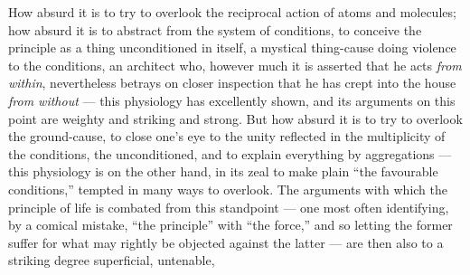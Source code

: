 \documentclass[12pt,a4paper]{book}
\begin{document}
How absurd it is to try to overlook the reciprocal action of atoms and
molecules; how absurd it is to abstract from the system of conditions, to
conceive the principle as a thing unconditioned in itself, a mystical
thing-cause doing violence to the conditions, an architect who, however much it
is asserted that he acts \emph{from within}, nevertheless betrays on closer
inspection that he has crept into the house \emph{from without} --- this
physiology has excellently shown, and its arguments on this point are weighty
and striking and strong. But how absurd it is to try to overlook the
ground-cause, to close one's eye to the unity reflected in the multiplicity of
the conditions, the unconditioned, and to explain everything by aggregations
--- this physiology is on the other hand, in its zeal to make plain ``the
favourable conditions,'' tempted in many ways to overlook. The arguments with
which the principle of life is combated from this standpoint --- one most often
identifying, by a comical mistake, ``the principle'' with ``the force,'' and so
letting the former suffer for what may rightly be objected against the latter
--- are then also to a striking degree superficial, untenable,
\end{document}
